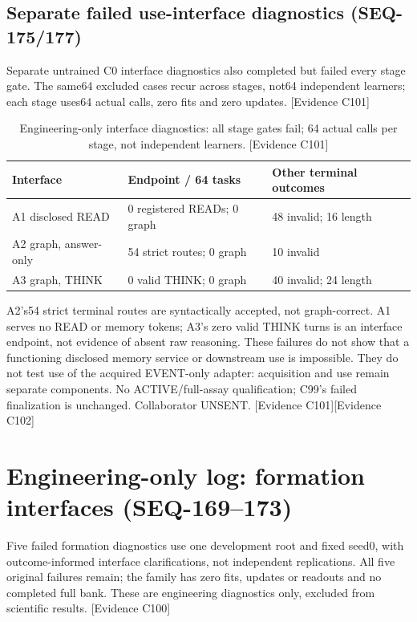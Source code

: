 \documentclass[11pt]{article}
\newcommand{\ev}[1]{\textsf{[Evidence #1]}}
\begin{document}
\subsection{Separate failed use-interface diagnostics (SEQ-175/177)}
Separate untrained C0 interface diagnostics also completed but failed every
stage gate. The same64 excluded cases recur across stages, not64 independent
learners; each stage uses64 actual calls, zero fits and zero updates. \ev{C101}

\begin{table}[ht]
\centering\small
\begin{tabular}{lll}
\toprule
Interface & Endpoint / 64 tasks & Other terminal outcomes \\
\midrule
A1 disclosed READ & 0 registered READs; 0 graph & 48 invalid; 16 length \\
A2 graph, answer-only & 54 strict routes; 0 graph & 10 invalid \\
A3 graph, THINK & 0 valid THINK; 0 graph & 40 invalid; 24 length \\
\bottomrule
\end{tabular}
\caption{Engineering-only interface diagnostics: all stage gates fail;
64 actual calls per stage, not independent learners. \ev{C101}}
\end{table}

A2's54 strict terminal routes are syntactically accepted, not graph-correct.
A1 serves no READ or memory tokens; A3's zero valid THINK turns is an interface
endpoint, not evidence of absent raw reasoning. These failures do not show
that a functioning disclosed memory service or downstream use is impossible.
They do not test use of the acquired EVENT-only adapter: acquisition and use
remain separate components. No ACTIVE/full-assay qualification; C99's failed
finalization is unchanged. Collaborator UNSENT. \ev{C101}\ev{C102}

\section{Engineering-only log: formation interfaces (SEQ-169--173)}
Five failed formation diagnostics use one development root and fixed seed0,
with outcome-informed interface clarifications, not independent replications.
All five original failures remain; the family has zero fits, updates or
readouts and no completed full bank. These are engineering diagnostics only,
excluded from scientific results. \ev{C100}
\end{document}
